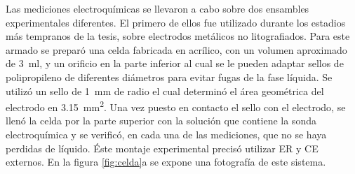 			Las mediciones electroquímicas se llevaron a cabo sobre dos ensambles experimentales diferentes. El primero de ellos fue utilizado durante los estadios más tempranos de la tesis, sobre electrodos metálicos no litografiados. Para este armado se preparó una celda fabricada en acrílico, con un volumen aproximado de \SI{3}{\ml}, y un orificio en la parte inferior al cual se le pueden adaptar sellos de polipropileno de diferentes diámetros para evitar fugas de la fase líquida. Se utilizó un sello de \SI{1}{\mm} de radio el cual determinó el área geométrica del electrodo en \SI{3.15}{\mm^{2}}. Una vez puesto en contacto el sello con el electrodo, se llenó la celda por la parte superior con la solución que contiene la sonda electroquímica y se verificó, en cada una de las mediciones, que no se haya perdidas de líquido. Éste montaje experimental precisó utilizar ER y CE externos. En la figura \ref{fig:celda}a se expone una fotografía de este sistema. 

